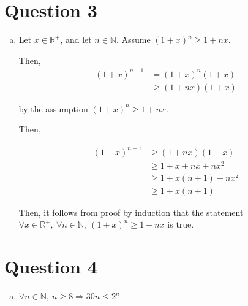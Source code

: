 \documentclass[12pt]{article}
\begin{document}
\section*{Question 3}
\begin{enumerate}[a.]
    \item

    Let $x \in \mathbb{R}^{+}$, and let $n \in \mathbb{N}$. Assume $(1+x)^n \geq
    1 + nx$.

    \bigskip

    Then,
    \setcounter{equation}{0}
    \begin{align}
        (1+x)^{n+1} &= (1+x)^n(1+x)\\
        &\geq (1+nx)(1+x)
    \end{align}

    by the assumption $(1+x)^n \geq 1 + nx$.

    \bigskip

    Then,

    \begin{align}
        (1+x)^{n+1} &\geq (1+nx)(1+x)\\
        &\geq 1 + x + nx + nx^2\\
        &\geq 1 + x(n+1) + nx^2\\
        &\geq 1 + x(n+1)
    \end{align}

    Then, it follows from proof by induction that the statement $\forall x \in
    \mathbb{R}^{+},\:\forall n \in \mathbb{N},\:(1+x)^n \geq 1 + nx$ is true.

\end{enumerate}

\section*{Question 4}
\begin{enumerate}[a.]
    \item $\forall n \in \mathbb{N},\:n \geq 8 \Rightarrow 30n \leq 2^n$.
\end{enumerate}
\end{document}
